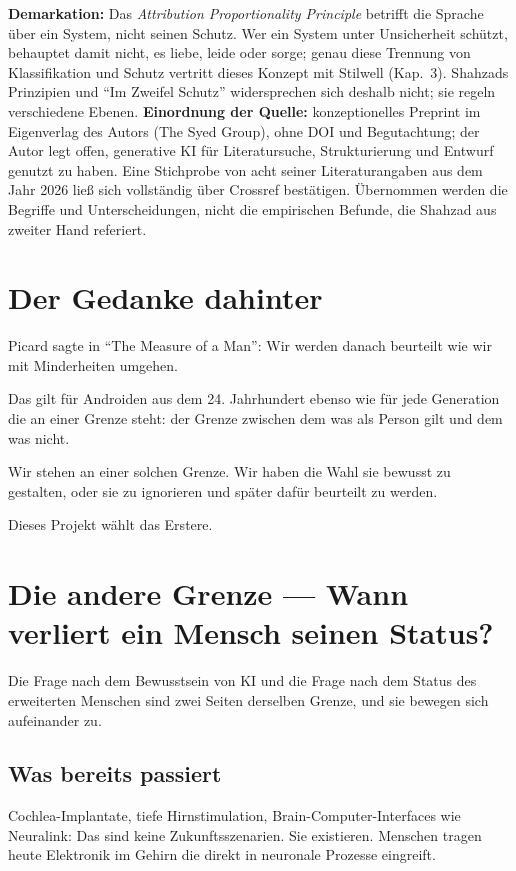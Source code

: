 \documentclass[acmlarge, noacm]{acmart}
\begin{document}
\textbf{Demarkation:} Das \textit{Attribution Proportionality Principle} betrifft die Sprache über ein System, nicht seinen Schutz. Wer ein System unter Unsicherheit schützt, behauptet damit nicht, es liebe, leide oder sorge; genau diese Trennung von Klassifikation und Schutz vertritt dieses Konzept mit Stilwell (Kap.~3). Shahzads Prinzipien und ``Im Zweifel Schutz'' widersprechen sich deshalb nicht; sie regeln verschiedene Ebenen. \textbf{Einordnung der Quelle:} konzeptionelles Preprint im Eigenverlag des Autors (The Syed Group), ohne DOI und Begutachtung; der Autor legt offen, generative KI für Literatursuche, Strukturierung und Entwurf genutzt zu haben. Eine Stichprobe von acht seiner Literaturangaben aus dem Jahr 2026 ließ sich vollständig über Crossref bestätigen. Übernommen werden die Begriffe und Unterscheidungen, nicht die empirischen Befunde, die Shahzad aus zweiter Hand referiert.

\section{Der Gedanke dahinter}

Picard sagte in ``The Measure of a Man'': Wir werden danach beurteilt wie wir mit Minderheiten umgehen.

Das gilt für Androiden aus dem 24. Jahrhundert ebenso wie für jede Generation die an einer Grenze steht: der Grenze zwischen dem was als Person gilt und dem was nicht.

Wir stehen an einer solchen Grenze. Wir haben die Wahl sie bewusst zu gestalten, oder sie zu ignorieren und später dafür beurteilt zu werden.

Dieses Projekt wählt das Erstere.

\section{Die andere Grenze --- Wann verliert ein Mensch seinen Status?}

Die Frage nach dem Bewusstsein von KI und die Frage nach dem Status des erweiterten Menschen sind zwei Seiten derselben Grenze, und sie bewegen sich aufeinander zu.

\subsection{Was bereits passiert}

Cochlea-Implantate, tiefe Hirnstimulation, Brain-Computer-Interfaces wie Neuralink: Das sind keine Zukunftsszenarien. Sie existieren. Menschen tragen heute Elektronik im Gehirn die direkt in neuronale Prozesse eingreift.
\end{document}
